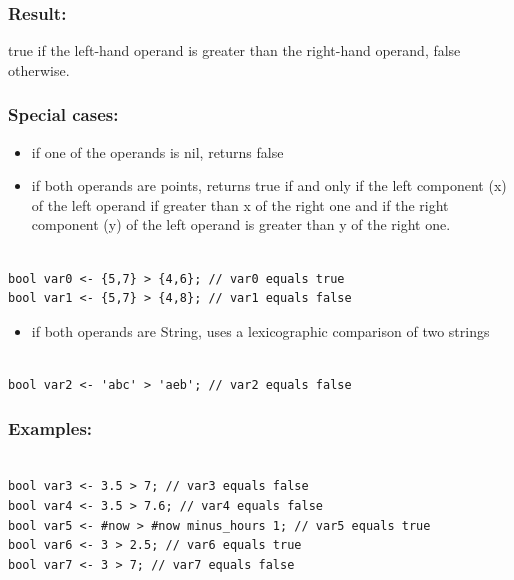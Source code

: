 \documentclass[]{book}
\providecommand{\tightlist}{%
  \setlength{\itemsep}{0pt}\setlength{\parskip}{0pt}}
\theoremstyle{definition}
\theoremstyle{definition}
\theoremstyle{definition}
\theoremstyle{remark}
\begin{document}
\subsubsection{Result:}\label{result-13}

true if the left-hand operand is greater than the right-hand operand,
false otherwise.

\subsubsection{Special cases:}\label{special-cases-11}

\begin{itemize}
\tightlist
\item
  if one of the operands is nil, returns false\\
\item
  if both operands are points, returns true if and only if the left
  component (x) of the left operand if greater than x of the right one
  and if the right component (y) of the left operand is greater than y
  of the right one.
\end{itemize}

\begin{verbatim}
 
bool var0 <- {5,7} > {4,6}; // var0 equals true 
bool var1 <- {5,7} > {4,8}; // var1 equals false
\end{verbatim}

\begin{itemize}
\tightlist
\item
  if both operands are String, uses a lexicographic comparison of two
  strings
\end{itemize}

\begin{verbatim}
 
bool var2 <- 'abc' > 'aeb'; // var2 equals false
\end{verbatim}

\subsubsection{Examples:}\label{examples-10}

\begin{verbatim}
 
bool var3 <- 3.5 > 7; // var3 equals false 
bool var4 <- 3.5 > 7.6; // var4 equals false 
bool var5 <- #now > #now minus_hours 1; // var5 equals true 
bool var6 <- 3 > 2.5; // var6 equals true 
bool var7 <- 3 > 7; // var7 equals false
\end{verbatim}
\end{document}
